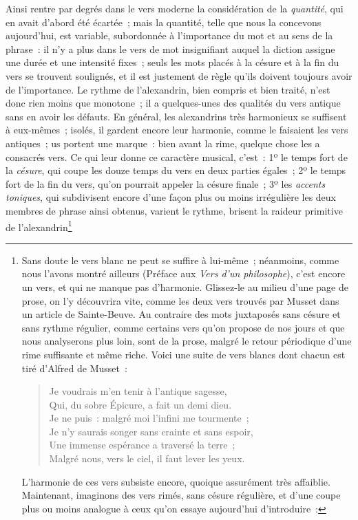 \documentclass[french,twoside]{book} %
\begin{document}
Ainsi rentre par degrés dans le vers moderne la considération de la \emph{quantité}, qui en avait d’abord été écartée ; mais la quantité, telle que nous la concevons aujourd’hui, est variable, subordonnée à l’importance du mot et au sens de la phrase : il n’y a plus dans le vers de mot insignifiant auquel la diction assigne une durée et une intensité fixes ; seuls les mots placés à la césure et à la fin du vers se trouvent soulignés, et il est justement de règle qu’ils doivent toujours avoir de l’importance. Le rythme de l’alexandrin, bien compris et bien traité, n’est donc rien moins que monotone ; il a quelques-unes des qualités du vers antique sans en avoir les défauts. En général, les alexandrins très harmonieux se suffisent à eux-mêmes ; isolés, il gardent encore leur harmonie, comme le faisaient les vers antiques ; us portent une marque : bien avant la rime, quelque chose les a consacrés vers. Ce qui leur donne ce  caractère musical, c’est : 1º le temps fort de la \emph{césure}, qui coupe les douze temps du vers en deux parties égales ; 2º le temps fort de la fin du vers, qu’on pourrait appeler la césure finale ; 3º les \emph{accents toniques}, qui subdivisent encore d’une façon plus ou moins irrégulière les deux membres de phrase ainsi obtenus, varient le rythme, brisent la raideur primitive de l’alexandrin\footnote{\noindent Sans doute le vers blanc ne peut se suffire à lui-même ; néanmoins, comme nous l’avons montré ailleurs (Préface aux \emph{Vers d’un philosophe}), c’est encore un vers, et qui ne manque pas d’harmonie. Glissez-le au milieu d’une page de prose, on l’y découvrira vite, comme les deux vers trouvés par Musset dans un article de Sainte-Beuve. Au contraire des mots juxtaposés sans césure et sans rythme régulier, comme certains vers qu’on propose de nos jours et que nous analyserons plus loin, sont de la prose, malgré le retour périodique d’une rime suffisante et même riche. Voici une suite de vers blancs dont chacun est tiré d’Alfred de Musset :\par

\begin{verse}
Je voudrais m’en tenir à l’antique sagesse,\\
Qui, du sobre Épicure, a fait un demi dieu.\\
Je ne puis : malgré moi l’infini me tourmente ;\\
Je n’y saurais songer sans crainte et sans espoir,\\
Une immense espérance a traversé la terre ;\\
Malgré nous, vers le ciel, il faut lever les yeux.\\
\end{verse}
\par
\noindent L’harmonie de ces vers subsiste encore, quoique assurément très affaiblie. Maintenant, imaginons des vers rimés, sans césure régulière, et d’une coupe plus ou moins analogue à ceux qu’on essaye aujourd’hui d’introduire :\par

}
\end{document}
